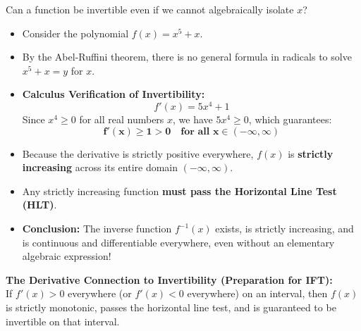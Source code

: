 \documentclass[10.5pt]{article}
\begin{document}
Can a function be invertible even if we cannot algebraically isolate $x$?
\begin{itemize}[leftmargin=1.2em, topsep=1pt, itemsep=2pt]
  \item Consider the polynomial $f(x) = x^5 + x$.
  \item By the Abel-Ruffini theorem, there is no general formula in radicals to solve $x^5 + x = y$ for $x$.
  \item \textbf{Calculus Verification of Invertibility:}
  \[
    f'(x) = 5x^4 + 1
  \]
  Since $x^4 \ge 0$ for all real numbers $x$, we have $5x^4 \ge 0$, which guarantees:
  \[
    \mathbf{f'(x) \ge 1 > 0 \quad \text{for all } x \in (-\infty, \infty)}
  \]
  \item Because the derivative is strictly positive everywhere, $f(x)$ is \textbf{strictly increasing} across its entire domain $(-\infty, \infty)$.
  \item Any strictly increasing function \textbf{must pass the Horizontal Line Test (HLT)}.
  \item \textbf{Conclusion:} The inverse function $f^{-1}(x)$ exists, is strictly increasing, and is continuous and differentiable everywhere, even without an elementary algebraic expression!
\end{itemize}

\begin{tcolorbox}[colback=chalkblue!6, colframe=chalkblue, boxrule=1pt, arc=3pt, left=8pt, right=8pt, top=4pt, bottom=4pt]
\textbf{The Derivative Connection to Invertibility (Preparation for IFT):}\\[1pt]
If $f'(x) > 0$ everywhere (or $f'(x) < 0$ everywhere) on an interval, then $f(x)$ is strictly monotonic, passes the horizontal line test, and is guaranteed to be invertible on that interval.
\end{tcolorbox}
\end{document}
